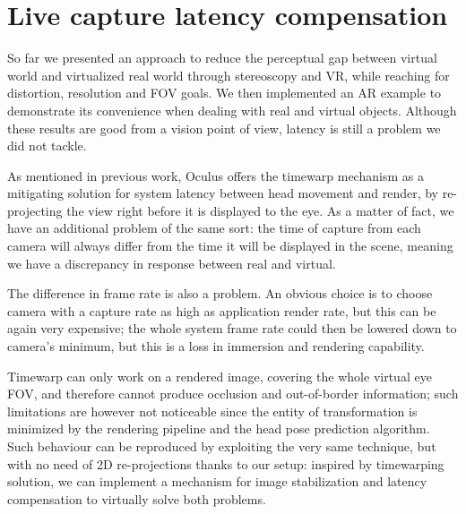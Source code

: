\section{Live capture latency compensation}
So far we presented an approach to reduce the perceptual gap between virtual world and virtualized real world through stereoscopy and VR, while reaching for distortion, resolution and FOV goals. We then implemented an AR example to demonstrate its convenience when dealing with real and virtual objects. Although these results are good from a vision point of view, latency is still a problem we did not tackle.

As mentioned in previous work, Oculus offers the timewarp mechanism as a mitigating solution for system latency between head movement and render, by re-projecting the view right before it is displayed to the eye. As a matter of fact, we have an additional problem of the same sort: the time of capture from each camera will always differ from the time it will be displayed in the scene, meaning we have a discrepancy in response between real and virtual.

The difference in frame rate is also a problem. An obvious choice is to choose camera with a capture rate as high as application render rate, but this can be again very expensive; the whole system frame rate could then be lowered down to camera's minimum, but this is a loss in immersion and rendering capability.

Timewarp can only work on a rendered image, covering the whole virtual eye FOV, and therefore cannot produce occlusion and out-of-border information; such limitations are however not noticeable since the entity of transformation is minimized by the rendering pipeline and the head pose prediction algorithm. Such behaviour can be reproduced by exploiting the very same technique, but with no need of 2D re-projections thanks to our setup: inspired by timewarping solution, we can implement a mechanism for image stabilization and latency compensation to virtually solve both problems.

